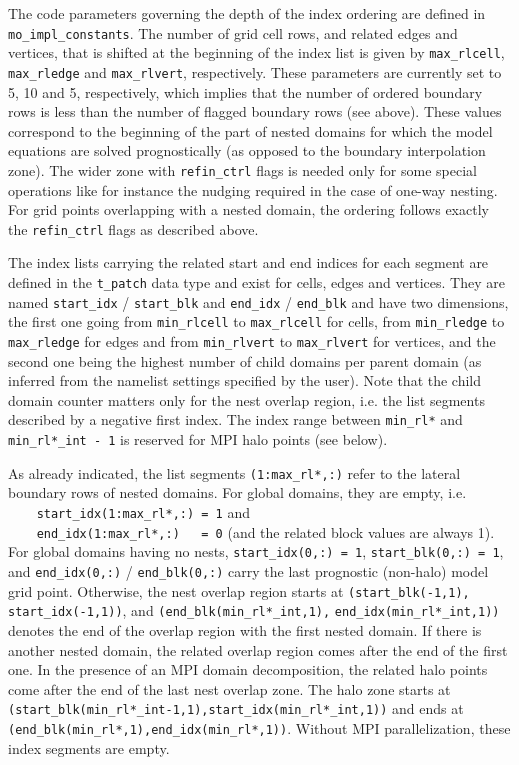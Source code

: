 \documentclass[11pt]{article}
\begin{document}
The code parameters governing the depth of the index ordering are defined in \verb+mo_impl_constants+.
The number of grid cell rows, and related edges and vertices, that is shifted at the beginning of the 
index list is given by \verb+max_rlcell+, \verb+max_rledge+ and \verb+max_rlvert+, respectively.
These parameters are currently set to 5, 10 and 5, respectively, which implies that the number of
ordered boundary rows is less than the number of flagged boundary rows (see above). These values correspond
to the beginning of the part of nested domains for which the model equations are solved prognostically
(as opposed to the boundary interpolation zone). The wider zone with \verb+refin_ctrl+ flags is needed only
for some special operations like for instance the nudging required in the case of one-way nesting. 
For grid points overlapping with a nested domain, the ordering follows exactly the \verb+refin_ctrl+ flags
as described above. 

The index lists carrying the related start and end indices for each segment are defined in the \verb+t_patch+ data type
and exist for cells, edges and vertices. They are named \verb+start_idx+ / \verb+start_blk+ and \verb+end_idx+ / 
\verb+end_blk+ and have two dimensions, the first one going from \verb+min_rlcell+ to \verb+max_rlcell+ for cells, 
from \verb+min_rledge+ to \verb+max_rledge+ for edges and from \verb+min_rlvert+ to \verb+max_rlvert+ for vertices, 
and the second one being the highest number of child domains per parent domain (as inferred from the namelist settings 
specified by the user). Note that the child domain counter matters only for the nest overlap region, i.e. the list
segments described by a negative first index. The index range between \verb+min_rl*+ and \verb+min_rl*_int - 1+ is
reserved for MPI halo points (see below).

As already indicated, the list segments \verb+(1:max_rl*,:)+ refer to the
lateral boundary rows of nested domains. For global domains, they are empty, i.e. \\
\verb+    start_idx(1:max_rl*,:) = 1+ and \\
\verb+    end_idx(1:max_rl*,:)   = 0+ (and the related block values are always 1). \\
For global domains having no nests, \verb+start_idx(0,:) = 1+, \verb+start_blk(0,:) = 1+, and \verb+end_idx(0,:)+ /
\verb+end_blk(0,:)+ carry the last prognostic (non-halo) model grid point.
Otherwise, the nest overlap region starts at \verb+(start_blk(-1,1), start_idx(-1,1))+, and 
\verb+(end_blk(min_rl*_int,1),+ \verb+end_idx(min_rl*_int,1))+ denotes the end of the overlap region with the first
nested domain. If there is another nested domain, the related overlap region comes after the end of the first one.
In the presence of an MPI domain decomposition, the related halo points come after the end of the
last nest overlap zone. The halo zone starts at \verb+(start_blk(min_rl*_int-1,1),start_idx(min_rl*_int,1))+
and ends at \verb+(end_blk(min_rl*,1),end_idx(min_rl*,1))+. Without MPI parallelization, these index segments
are empty.
\end{document}
